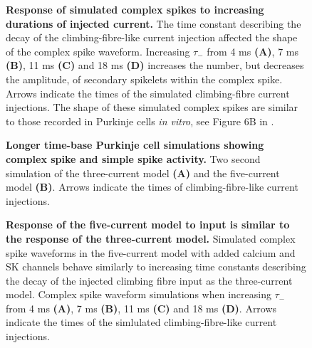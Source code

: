 \documentclass[utf8]{frontiersSCNS} %
\begin{document}
\begin{figure}[!ht]
\caption{\textbf {Response of simulated complex spikes to increasing
    durations of injected current.} The time constant describing the
  decay of the climbing-fibre-like current injection affected the
  shape of the complex spike waveform. Increasing $\tau_-$ from 4 ms
  \textbf{(A)}, 7 ms \textbf{(B)}, 11 ms \textbf{(C)} and 18 ms
  \textbf{(D)} increases the number, but decreases the amplitude, of
  secondary spikelets within the complex spike. Arrows indicate the times
  of the simulated climbing-fibre current injections. The shape of
  these simulated complex spikes are similar to those recorded in
  Purkinje cells \textit{in vitro}, see Figure 6B in
  \protect\cite{MonsivaisEtAl2005}.
\label{fig:injection_durations}}
\end{figure}

\begin{figure}[!ht]
\caption{\textbf{Longer time-base Purkinje cell simulations showing
    complex spike and simple spike activity.} Two second simulation of
  the three-current model \textbf{(A)} and the five-current model
    \textbf{(B)}. Arrows indicate the times of climbing-fibre-like
    current injections.}
\label{fig:long_time_base}
\end{figure}



\begin{figure}[!ht]
\caption{\textbf{Response of the five-current model to input is similar
    to the response of the three-current model.} Simulated complex
  spike waveforms in the five-current model with added calcium and SK
  channels behave similarly to increasing time constants describing the decay of the
  injected climbing fibre input as the three-current model. Complex spike waveform simulations when increasing $\tau_-$ from 4 ms
  \textbf{(A)}, 7 ms \textbf{(B)}, 11 ms \textbf{(C)} and 18 ms
  \textbf{(D)}. Arrows indicate the times
  of the simlulated climbing-fibre-like current injections.}
\label{S2_Fig}
\end{figure}
\end{document}
